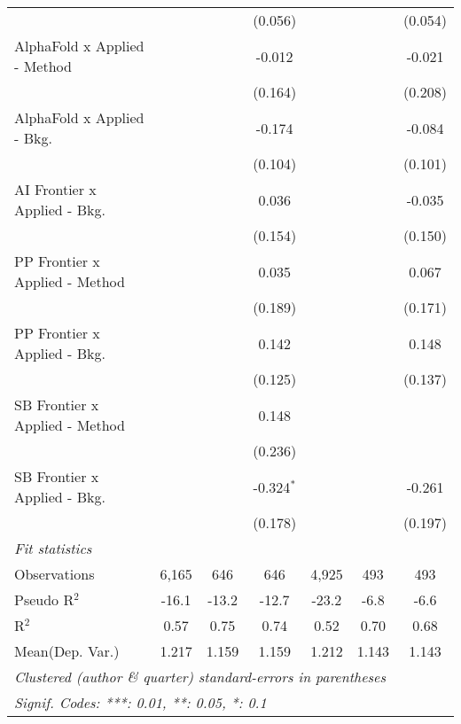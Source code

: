 \begin{tabular}{lcccccc}
                                  &         &              & (0.056)       &         &               & (0.054)\\   
   AlphaFold x Applied - Method   &         &              & -0.012        &         &               & -0.021\\   
                                  &         &              & (0.164)       &         &               & (0.208)\\   
   AlphaFold x Applied - Bkg.     &         &              & -0.174        &         &               & -0.084\\   
                                  &         &              & (0.104)       &         &               & (0.101)\\   
   AI Frontier x Applied - Bkg.   &         &              & 0.036         &         &               & -0.035\\   
                                  &         &              & (0.154)       &         &               & (0.150)\\   
   PP Frontier x Applied - Method &         &              & 0.035         &         &               & 0.067\\   
                                  &         &              & (0.189)       &         &               & (0.171)\\   
   PP Frontier x Applied - Bkg.   &         &              & 0.142         &         &               & 0.148\\   
                                  &         &              & (0.125)       &         &               & (0.137)\\   
   SB Frontier x Applied - Method &         &              & 0.148         &         &               &   \\   
                                  &         &              & (0.236)       &         &               &   \\   
   SB Frontier x Applied - Bkg.   &         &              & -0.324$^{*}$  &         &               & -0.261\\   
                                  &         &              & (0.178)       &         &               & (0.197)\\   
   \midrule
   \emph{Fit statistics}\\
   Observations                   & 6,165   & 646          & 646           & 4,925   & 493           & 493\\  
   Pseudo R$^2$                   & -16.1   & -13.2        & -12.7         & -23.2   & -6.8          & -6.6\\  
   R$^2$                          & 0.57    & 0.75         & 0.74          & 0.52    & 0.70          & 0.68\\  
Mean(Dep. Var.) & 1.217 & 1.159 & 1.159 & 1.212 & 1.143 & 1.143 \\
   \midrule \midrule
   \multicolumn{7}{l}{\emph{Clustered (author \& quarter) standard-errors in parentheses}}\\
   \multicolumn{7}{l}{\emph{Signif. Codes: ***: 0.01, **: 0.05, *: 0.1}}\\
\end{tabular}
\par\endgroup
